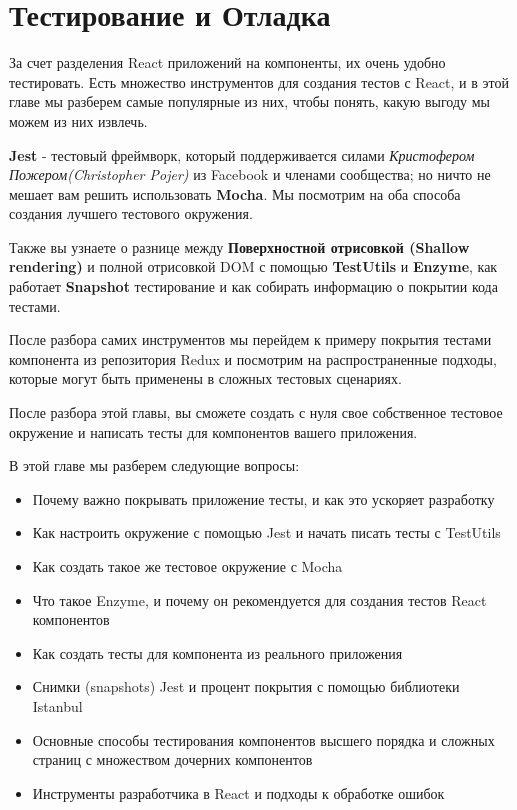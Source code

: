 \chapter{Тестирование и Отладка}

За счет разделения React приложений на компоненты, их очень удобно тестировать. Есть множество инструментов для создания тестов с React, и в этой главе мы разберем самые популярные из них, чтобы понять, какую выгоду мы можем из них извлечь.

\textbf{Jest} - тестовый фреймворк, который поддерживается силами \textit{Кристофером Пожером(Christopher Pojer)} из Facebook и членами сообщества; но ничто не мешает вам решить использовать \textbf{Mocha}. Мы посмотрим на оба способа создания лучшего тестового окружения.

Также вы узнаете о разнице между \textbf{Поверхностной отрисовкой (Shallow rendering)} и полной отрисовкой DOM с помощью \textbf{TestUtils} и \textbf{Enzyme}, как работает \textbf{Snapshot} тестирование и как собирать информацию о покрытии кода тестами.

После разбора самих инструментов мы перейдем к примеру покрытия тестами компонента из репозитория Redux и посмотрим на распространенные подходы, которые могут быть применены в сложных тестовых сценариях.

После разбора этой главы, вы сможете создать с нуля свое собственное тестовое окружение и написать тесты для компонентов вашего приложения.

В этой главе мы разберем следующие вопросы:

\begin{itemize}
	\item Почему важно покрывать приложение тесты, и как это ускоряет разработку
	\item Как настроить окружение с помощью Jest и начать писать тесты с TestUtils
	\item Как создать такое же тестовое окружение с Mocha
	\item Что такое Enzyme, и почему он рекомендуется для создания тестов React компонентов
	\item Как создать тесты для компонента из реального приложения
	\item Снимки (snapshots) Jest и процент покрытия с помощью библиотеки Istanbul
	\item Основные способы тестирования компонентов высшего порядка и сложных страниц с множеством дочерних компонентов
	\item Инструменты разработчика в React и подходы к обработке ошибок
\end{itemize}


